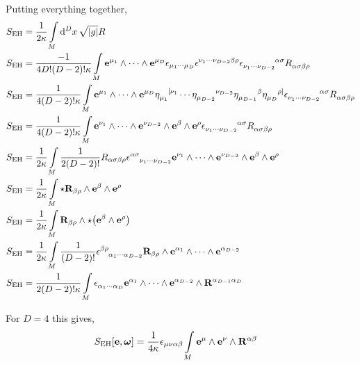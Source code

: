 Putting everything together,
\begin{align*}
    S_{\textnormal{EH}}&=\frac{1}{2\kappa}\int\limits_M\dd[D]{x}\sqrt{\abs{g}}R\\
    S_{\textnormal{EH}}&=\frac{-1}{4D!\qty(D-2)!\kappa}\int\limits_M\vb e^{\mu_1}\wedge\cdots\wedge\vb e^{\mu_{D}}\epsilon_{\mu_1\cdots\mu_{D}}\tensor{\epsilon}{^{\nu_1}^\cdots^{\nu_{D-2}}^\beta^\rho}\tensor{\epsilon}{_{\nu_1}_\cdots_{\nu_{D-2}}^\alpha^\sigma}\tensor{R}{_\alpha_\sigma_\beta_\rho}\\
    S_{\textnormal{EH}}&=\frac{1}{4\qty(D-2)!\kappa}\int\limits_M\vb e^{\mu_1}\wedge\cdots\wedge\vb e^{\mu_{D}}\tensor{\eta}{_{\mu_1}^{[\nu_1}}\cdots\tensor{\eta}{_{\mu_{D-2}}^{\nu_{D-2}}}\tensor{\eta}{_{\mu_{D-1}}^{\beta}}\tensor{\eta}{_{\mu_{D}}^{\rho]}}\tensor{\epsilon}{_{\nu_1}_\cdots_{\nu_{D-2}}^\alpha^\sigma}\tensor{R}{_\alpha_\sigma_\beta_\rho}\\
    S_{\textnormal{EH}}&=\frac{1}{4\qty(D-2)!\kappa}\int\limits_M\vb e^{\nu_1}\wedge\cdots\wedge\vb e^{\nu_{D-2}}\wedge\vb e^{\beta}\wedge\vb e^{\rho}\tensor{\epsilon}{_{\nu_1}_\cdots_{\nu_{D-2}}^\alpha^\sigma}\tensor{R}{_\alpha_\sigma_\beta_\rho}\\
    S_{\textnormal{EH}}&=\frac{1}{2\kappa}\int\limits_M\frac{1}{2\qty(D-2)!}R_{\alpha\sigma\beta\rho}\tensor{\epsilon}{^\alpha^\sigma_{\nu_1}_\cdots_{\nu_{D-2}}}\vb e^{\nu_1}\wedge\cdots\wedge\vb e^{\nu_{D-2}}\wedge\vb e^{\beta}\wedge\vb e^{\rho}\\
    S_{\textnormal{EH}}&=\frac{1}{2\kappa}\int\limits_M\star\vb R_{\beta\rho}\wedge\vb e^{\beta}\wedge\vb e^{\rho}\\
    S_{\textnormal{EH}}&=\frac{1}{2\kappa}\int\limits_M\vb R_{\beta\rho}\wedge\star\qty(\vb e^{\beta}\wedge\vb e^{\rho})\\
    S_{\textnormal{EH}}&=\frac{1}{2\kappa}\int\limits_M\frac{1}{\qty(D-2)!}\tensor{\epsilon}{^\beta^\rho_{\alpha_1}_\cdots_{\alpha_{D-2}}}\vb R_{\beta\rho}\wedge\vb e^{\alpha_1}\wedge\cdots\wedge\vb e^{\alpha_{D-2}}\\
    S_{\textnormal{EH}}&=\frac{1}{2\qty(D-2)!\kappa}\int\limits_M\tensor{\epsilon}{_{\alpha_1}_\cdots_{\alpha_{D}}}\vb e^{\alpha_1}\wedge\cdots\wedge\vb e^{\alpha_{D-2}}\wedge\vb R^{\alpha_{D-1}\alpha_{D}}
\end{align*}

For $D=4$ this gives,
\begin{align*}
    S_{\textnormal{EH}}\qty[\vb e,\boldsymbol\omega]&=\frac{1}{4\kappa}\epsilon_{\mu\nu\alpha\beta}\int\limits_M\vb e^{\mu}\wedge\vb e^\nu\wedge\vb R^{\alpha\beta}
\end{align*}

